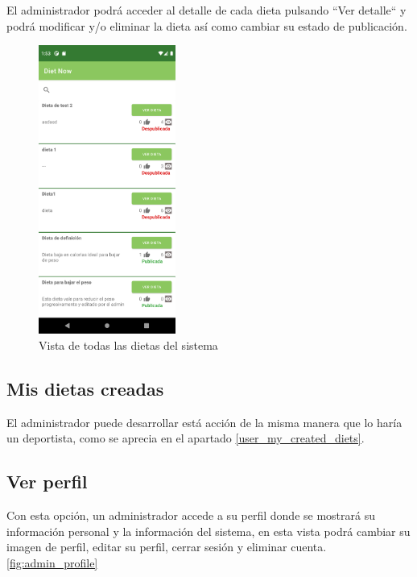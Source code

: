 El administrador podrá acceder al detalle de cada dieta pulsando ``Ver detalle`` y podrá modificar y/o eliminar la dieta así como cambiar su estado de publicación.

\begin{figure}[H]
    \centering
    \includegraphics[width=0.4\textwidth]{Images/Annexes/allSysDiets.png}
    \caption{Vista de todas las dietas del sistema}
    \label{fig:todas_dietas}
\end{figure}


\subsection{Mis dietas creadas}
El administrador puede desarrollar está acción de la misma manera que lo haría un deportista, como se aprecia en el apartado \ref{user_my_created_diets}.

\subsection{Ver perfil}
Con esta opción, un administrador accede a su perfil donde se mostrará su información personal y la información del sistema, en esta vista podrá cambiar su imagen de perfil, editar su perfil, cerrar sesión y eliminar cuenta.\ref{fig:admin_profile}

